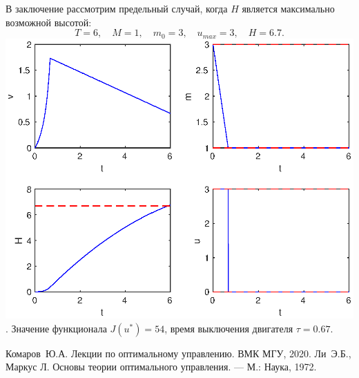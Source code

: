 \documentclass[16pt]{article}
\begin{document}
\newpage
В заключение рассмотрим предельный случай, когда $H$ является максимально возможной высотой:
$$T = 6, \quad M = 1, \quad m_0 = 3, \quad u_{max} = 3, \quad H = 6.7.$$
\includegraphics[width=160mm]{13.eps}. Значение функционала $J(u^*) = 54$, время выключения двигателя
$\tau = 0.67$.

\newpage
\begin{thebibliography}{0}
	Комаров~Ю.А. Лекции по оптимальному управлению. ВМК МГУ, 2020. 
	Ли~Э.Б., Маркус Л. Основы теории оптимального управления. --- М.: Наука, 1972.
\end{thebibliography}
\end{document}
